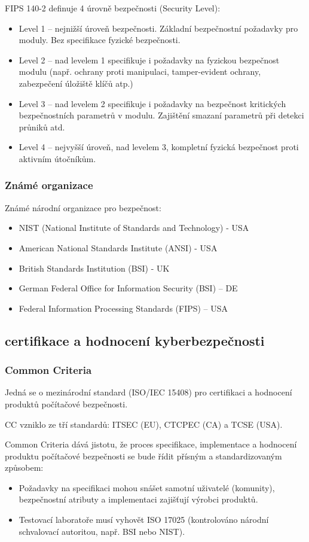 FIPS 140-2 definuje 4 úrovně bezpečnosti (Security Level):
\begin{itemize}
    \item Level 1 – nejnižší úroveň bezpečnosti. Základní bezpečnostní požadavky pro moduly. Bez specifikace fyzické bezpečnosti.
    \item Level 2 – nad levelem 1 specifikuje i požadavky na fyzickou bezpečnost modulu (např. ochrany proti manipulaci, tamper-evident ochrany, zabezpečení úložiště klíčů atp.)
    \item Level 3 – nad levelem 2 specifikuje i požadavky na bezpečnost kritických bezpečnostních parametrů v modulu. Zajištění smazaní parametrů při detekci průniků atd.
    \item Level 4 – nejvyšší úroveň, nad levelem 3, kompletní fyzická bezpečnost proti aktivním útočníkům.
\end{itemize}

\subsubsection{Známé organizace}
Známé národní organizace pro bezpečnost:
\begin{itemize}
    \item NIST (National Institute of Standards and Technology) - USA
    \item American National Standards Institute (ANSI) - USA
    \item British Standards Institution (BSI) - UK
    \item German Federal Office for Information Security (BSI) – DE
    \item Federal Information Processing Standards (FIPS) – USA
\end{itemize}

\subsection{certifikace a hodnocení kyberbezpečnosti}

\subsubsection{Common Criteria}
Jedná se o mezinárodní standard (ISO/IEC 15408) pro certifikaci a hodnocení produktů počítačové bezpečnosti.


CC vzniklo ze tří standardů: ITSEC (EU), CTCPEC (CA) a TCSE (USA).

Common Criteria dává jistotu, že proces specifikace, implementace a hodnocení produktu počítačové bezpečnosti se bude řídit přísným a standardizovaným způsobem:
\begin{itemize}
    \item Požadavky na specifikaci mohou snášet samotní uživatelé (komunity), bezpečnostní atributy a implementaci zajišťují výrobci produktů.
    \item Testovací laboratoře musí vyhovět ISO 17025 (kontrolováno národní schvalovací autoritou, např. BSI nebo NIST).
\end{itemize}

